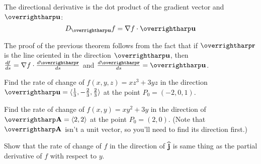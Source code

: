 \documentclass[letterpaper, twoside, 12pt]{book}
\begin{document}
\begin{theorem}
  The directional derivative is the dot product of the gradient
  vector and $\vect{u}$:
  \[
    D_{\vect{u}}f = \nabla f \cdot \vect{u}
  \]
\end{theorem}

\begin{remark}
  The proof of the previous theorem follows from the fact that if
  $\vect{r}$ is the line oriented in the direction $\vect{u}$, then
  $\frac{df}{ds}=\nabla f \cdot \frac{d\vect{r}}{ds}$ and
  $\frac{d\vect{r}}{ds}=\vect{u}$.
\end{remark}

          \begin{problem}
            Find the rate of change of $f(x,y,z)=xz^3+3yz$ in the direction
            $\vect{u}=\<\frac{1}{3},-\frac{2}{3},\frac{2}{3}\>$
            at the point $P_0=(-2,0,1)$.
          \end{problem}

          \begin{solution}

          \end{solution}

          \begin{problem}
            Find the rate of change of $f(x,y)=xy^2+3y$
            in the direction of $\vect{A}=\<2,2\>$
            at the point $P_0=(2,0)$. (Note that $\vect{A}$ isn't
            a unit vector, so you'll need to find its direction first.)
          \end{problem}

          \begin{solution}

          \end{solution}

          \begin{problem}
            Show that the rate of change of $f$ in the direction of
            $\mathbf{\widehat{j}}$ is same thing as the partial derivative of $f$
            with respect to $y$.
          \end{problem}

          \begin{solution}

          \end{solution}
\end{document}
